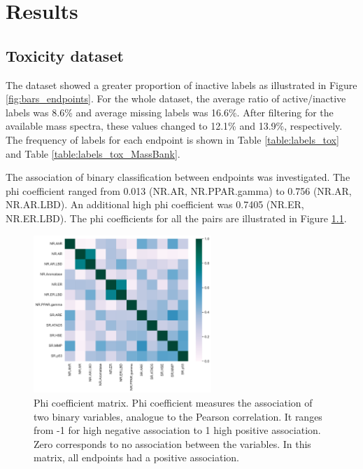 \chapter{Results}

\section*{Toxicity dataset}

The dataset showed a greater proportion of inactive labels as illustrated in Figure \ref{fig:bars_endpoints}. For the whole dataset, the average ratio of active/inactive labels was 8.6\% and average missing labels was 16.6\%. After filtering for the available mass spectra, these values changed to 12.1\% and 13.9\%, respectively. The frequency of labels for each endpoint is shown in Table \ref{table:labels_tox} and Table \ref{table:labels_tox_MassBank}.


The association of binary classification between endpoints was investigated. The phi coefficient ranged from 0.013 (NR.AR, NR.PPAR.gamma) to 0.756 (NR.AR, NR.AR.LBD). An additional high phi coefficient was 0.7405 (NR.ER, NR.ER.LBD). The phi coefficients for all the pairs are illustrated in Figure \ref{fig:phi_coefficient}.

\begin{figure}[H]
	\centering
  \includegraphics[width=0.6\textwidth]{include/img/appendix/phi_matrix.pdf}
  \caption{Phi coefficient matrix. Phi coefficient measures the association of two binary variables, analogue to the Pearson correlation. It ranges from -1 for high negative association to 1 high positive association. Zero corresponds to no association between the variables. In this matrix, all endpoints had a positive association. }
  \label{fig:phi_coefficient}
\end{figure}

